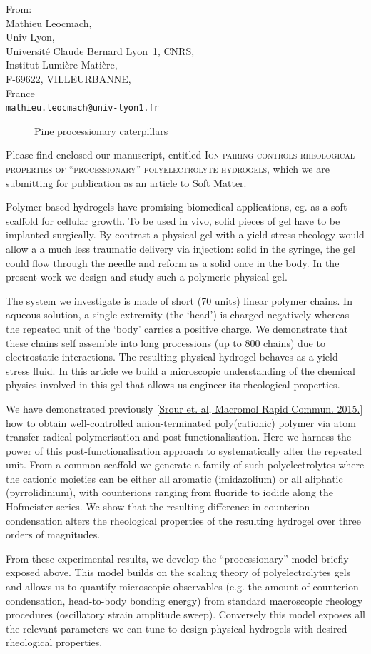 \documentclass[a4paper, parskip=true, firsthead=false, fromemail=true, foldmarks=false]{scrlttr2}
\newcommand{\journal}{Soft Matter}
\begin{document}
\begin{letter}{From:\\
Mathieu Leocmach,\\
Univ Lyon,\\ 
Universit\'e Claude Bernard Lyon~1, CNRS,\\
Institut Lumi\`ere Mati\`ere,\\
F-69622, VILLEURBANNE,\\
France\\
\texttt{mathieu.leocmach@univ-lyon1.fr}
}
\begin{figure}
\raggedright
Pine processionary caterpillars
\end{figure}

Please find enclosed our manuscript, entitled \textsc{Ion pairing controls rheological properties of ``processionary'' polyelectrolyte hydrogels}, which we are submitting for publication as an article to \journal.

Polymer-based hydrogels have promising biomedical applications, eg. as a soft scaffold for cellular growth. To be used in vivo, solid pieces of gel have to be implanted surgically. By contrast a physical gel with a yield stress rheology would allow a a much less traumatic delivery via injection: solid in the syringe, the gel could flow through the needle and reform as a solid once in the body. In the present work we design and study such a polymeric physical gel.

The system we investigate is made of short (70 units) linear polymer chains. In aqueous solution, a single extremity (the `head') is charged negatively whereas the repeated unit of the `body' carries a positive charge. We demonstrate that these chains self assemble into long processions (up to 800 chains) due to electrostatic interactions. %
The resulting physical hydrogel behaves as a yield stress fluid. In this article we build a microscopic understanding of the chemical physics involved in this gel that allows us engineer its rheological properties.

We have demonstrated previously [\href{ https://doi.org/10.1002/marc.201400478}{Srour et. al, Macromol Rapid Commun. 2015.}] how to obtain well-controlled anion-terminated poly(cationic) polymer via atom transfer radical polymerisation and post-functionalisation. Here we harness the power of this post-functionalisation approach to systematically alter the repeated unit. From a common scaffold we generate a family of such polyelectrolytes where the cationic moieties can be either all aromatic (imidazolium) or all aliphatic (pyrrolidinium), with counterions ranging from fluoride to iodide along the Hofmeister series. We show that the resulting difference in counterion condensation alters the rheological properties of the resulting hydrogel over three orders of magnitudes.

From these experimental results, we develop the ``processionary'' model briefly exposed above. This model builds on the scaling theory of polyelectrolytes gels and allows us to quantify microscopic observables (e.g. the amount of counterion condensation, head-to-body bonding energy) from standard macroscopic rheology procedures (oscillatory strain amplitude sweep). Conversely this model exposes all the relevant parameters we can tune to design physical hydrogels with desired rheological properties.



\end{letter}
\end{document}
